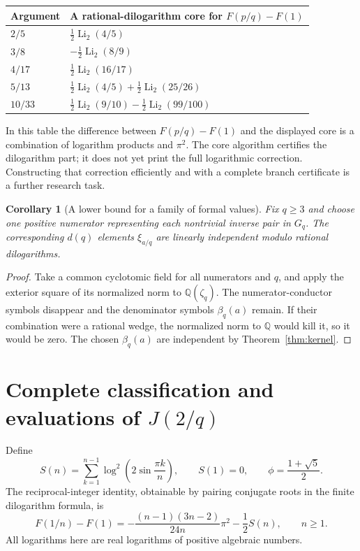 \documentclass[11pt]{article}
\numberwithin{equation}{section}
\newtheorem{corollary}[theorem]{Corollary}
\theoremstyle{definition}
\theoremstyle{remark}
\newcommand{\Q}{\mathbb Q}
\DeclareMathOperator{\Li}{Li}
\begin{document}
\begin{center}
\begin{tabular}{ll}
\toprule
Argument & A rational-dilogarithm core for $F(p/q)-F(1)$\\
\midrule
$2/5$ & $\tfrac12\Li_2(4/5)$\\
$3/8$ & $-\tfrac12\Li_2(8/9)$\\
$4/17$ & $\tfrac12\Li_2(16/17)$\\
$5/13$ & $\tfrac12\Li_2(4/5)+\tfrac12\Li_2(25/26)$\\
$10/33$ & $\tfrac12\Li_2(9/10)-\tfrac12\Li_2(99/100)$\\
\bottomrule
\end{tabular}
\end{center}
In this table the difference between $F(p/q)-F(1)$ and the displayed
core is a combination of logarithm products and $\pi^2$. The core
algorithm certifies the dilogarithm part; it does not yet print the full
logarithmic correction. Constructing that correction efficiently and
with a complete branch certificate is a further research task.

\begin{corollary}[A lower bound for a family of formal values]
Fix $q\ge3$ and choose one positive numerator representing each
nontrivial inverse pair in $G_q$. The corresponding $d(q)$ elements
$\xi_{a/q}$ are linearly independent modulo rational dilogarithms.
\end{corollary}
\begin{proof}
Take a common cyclotomic field for all numerators and $q$, and apply the
exterior square of its normalized norm to $\Q(\zeta_q)$. The
numerator-conductor symbols disappear and the denominator symbols
$\beta_q(a)$ remain. If their combination were a rational wedge, the
normalized norm to $\Q$ would kill it, so it would be zero. The chosen
$\beta_q(a)$ are independent by Theorem~\ref{thm:kernel}.
\end{proof}

\section{Complete classification and evaluations of \texorpdfstring{$J(2/q)$}{J(2/q)}}
\label{sec:J}

Define
\[
 S(n)=\sum_{k=1}^{n-1}\log^2\!\left(2\sin\frac{\pi k}{n}\right),
 \qquad S(1)=0,
 \qquad \phi=\frac{1+\sqrt5}{2}.
\]
The reciprocal-integer identity, obtainable by pairing conjugate roots
in the finite dilogarithm formula, is
\begin{equation}\label{eq:F1n}
 F(1/n)-F(1)
 =-\frac{(n-1)(3n-2)}{24n}\pi^2-\frac12 S(n),\qquad n\ge1.
\end{equation}
All logarithms here are real logarithms of positive algebraic numbers.
\end{document}
